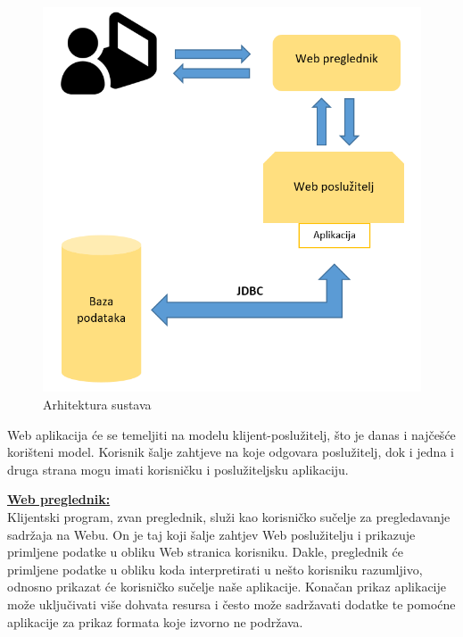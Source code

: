 		\begin{figure}[H]
					\includegraphics[scale=0.8]{arhitektura/arhitektura_sustava.png} %
					\centering
					\caption{Arhitektura sustava}
					\label{fig:arhitektura}
		\end{figure}

	\vspace{5mm} %

		Web aplikacija će se temeljiti na modelu klijent-poslužitelj, što je danas i najčešće korišteni model. Korisnik šalje zahtjeve na koje odgovara poslužitelj, dok i jedna i druga strana mogu imati korisničku i poslužiteljsku aplikaciju.

	\vspace{10mm} %

		\textbf{\underline{Web preglednik:} }\\

			Klijentski program, zvan preglednik, služi kao korisničko sučelje za pregledavanje sadržaja na Webu. On je taj koji šalje zahtjev Web poslužitelju i prikazuje primljene podatke u obliku Web stranica korisniku. Dakle, preglednik će primljene podatke u obliku koda interpretirati u nešto korisniku razumljivo, odnosno prikazat će korisničko sučelje naše aplikacije. Konačan prikaz aplikacije može uključivati više dohvata resursa i često može sadržavati dodatke te pomoćne aplikacije za prikaz formata koje izvorno ne podržava.

